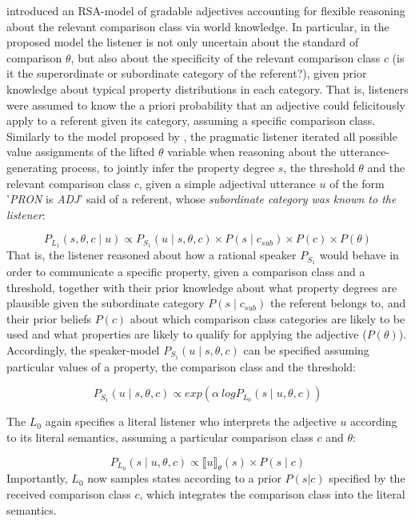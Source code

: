 \textcite{tessler2017warm} introduced an RSA-model of gradable adjectives accounting for flexible reasoning about the relevant comparison class via world knowledge. In particular, in the proposed model the listener is not only uncertain about the standard of comparison $\theta$, but also about the specificity of the relevant comparison class $c$ (is it the superordinate or subordinate category of the referent?), given prior knowledge about typical property distributions in each category. That is, listeners were assumed to know the a priori probability that an adjective could felicitously apply to a referent given its category, assuming a specific comparison class.
Similarly to the model proposed by \textcite{lassiter2013context}, the pragmatic listener iterated all possible value assignments of the lifted $\theta$ variable when reasoning about the utterance-generating process, to jointly infer the property degree $s$, the threshold $\theta$ and the relevant comparison class $c$, given a simple adjectival utterance $u$ of the form '\emph{PRON} is \emph{ADJ}' said of a referent, whose \emph{subordinate category was known to the listener}:

$$P_{L_1}(s, \theta, c \mid u) \propto P_{S_1} ( u \mid s, \theta, c) \times P(s \mid c_{sub}) \times P(c) \times P(\theta)$$  
That is, the listener reasoned about how a rational speaker $P_{S_1}$ would behave in order to communicate a specific property, given a comparison class and a threshold, together with their prior knowledge about what property degrees are plausible given the subordinate category $P(s \mid c _{sub})$ the referent belongs to, and their prior beliefs $P(c)$ about which comparison class categories are likely to be used and what properties are likely to qualify for applying the adjective ($P(\theta)$). Accordingly, the speaker-model $P_{S_1}( u \mid s, \theta, c)$ can be specified assuming particular values of a property, the comparison class and the threshold:

$$P_{S_1}( u \mid s, \theta, c) \propto exp(\alpha \: log P_{L_0} (s \mid u, \theta, c))$$

The $L_0$ again specifies a literal listener who interprets the adjective $u$ according to its literal semantics, assuming a particular comparison class $c$ and $\theta$:

$$P_{L_0}(s \mid u, \theta, c) \propto \llbracket u \rrbracket_{\theta} (s) \times P( s \mid c)$$  
Importantly, $L_0$ now samples states according to a prior $P(s|c)$ specified by the received comparison class $c$, which integrates the comparison class into the literal semantics. 

